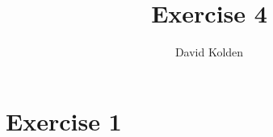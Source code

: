\documentclass{article}
\title{Exercise 4}
\author{David Kolden}
\begin{document}
\maketitle
\section{Exercise 1}
\end{document}
